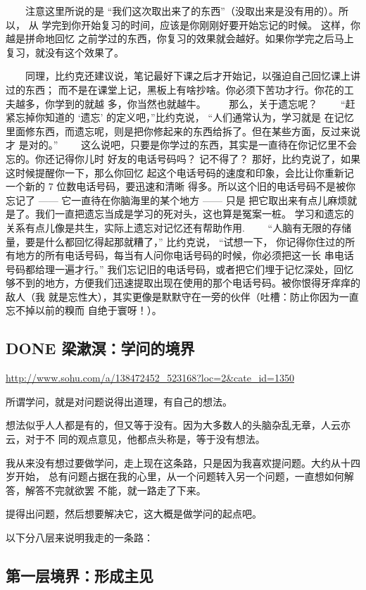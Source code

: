 \documentclass[11pt]{ctexart}
\begin{document}
{{{{　　注意这里所说的是 “我们这次取出来了的东西”（没取出来是没有用的）。所以， 从
学完到你开始复习的时间，应该是你刚刚好要开始忘记的时候。 这样，你越是拼命地回忆
之前学过的东西，你复习的效果就会越好。如果你学完之后马上复习，就没有这个效果了。

　　同理，比约克还建议说，笔记最好下课之后才开始记，以强迫自己回忆课上讲过的东西；
而不是在课堂上记，黑板上有啥抄啥。你必须下苦功才行。你花的工夫越多，你学到的就越
多，你当然也就越牛。
　　那么，关于遗忘呢？
　　“赶紧忘掉你知道的 ‘遗忘’ 的定义吧，”比约克说， “人们通常认为，学习就是
在记忆里面修东西，而遗忘呢，则是把你修起来的东西给拆了。但在某些方面，反过来说才
是对的。”
　　这么说吧，只要是你学过的东西，其实是一直待在你记忆里不会忘的。你还记得你儿时
好友的电话号码吗？ 记不得了？ 那好，比约克说了，如果这时候提醒你一下，那么你回忆
起这个电话号码的速度和印象，会比让你重新记一个新的 7 位数电话号码，要迅速和清晰
得多。所以这个旧的电话号码不是被你忘记了 —— 它一直待在你脑海里的某个地方 —— 只是
把它取出来有点儿麻烦就是了。我们一直把遗忘当成是学习的死对头，这也算是冤案一桩。
学习和遗忘的关系有点儿像是共生，实际上遗忘对记忆还有帮助作用.
　　“人脑有无限的存储量，要是什么都回忆得起那就糟了，” 比约克说， “试想一下，
你记得你住过的所有地方的所有电话号码，每当有人问你电话号码的时候，你必须把这一长
串电话号码都给理一遍才行。” 我们忘记旧的电话号码，或者把它们埋于记忆深处，回忆
够不到的地方，方便我们迅速提取出现在使用的那个电话号码。被你恨得牙痒痒的敌人（我
就是忘性大），其实更像是默默守在一旁的伙伴（吐槽：防止你因为一直忘不掉以前的糗而
自绝于寰呀！）。

\subsection{{\bfseries\sffamily DONE} 梁漱溟：学问的境界}
\label{sec:org317f244}
\url{http://www.sohu.com/a/138472452\_523168?loc=2\&cate\_id=1350}

所谓学问，就是对问题说得出道理，有自己的想法。

想法似乎人人都是有的，但又等于没有。因为大多数人的头脑杂乱无章，人云亦云，对于不
同的观点意见，他都点头称是，等于没有想法。

我从来没有想过要做学问，走上现在这条路，只是因为我喜欢提问题。大约从十四岁开始，
总有问题占据在我的心里，从一个问题转入另一个问题，一直想如何解答，解答不完就欲罢
不能，就一路走了下来。

提得出问题，然后想要解决它，这大概是做学问的起点吧。

以下分八层来说明我走的一条路：

\subsection{第一层境界：形成主见}
\label{sec:orgc7b5756}

}}}}
\end{document}
